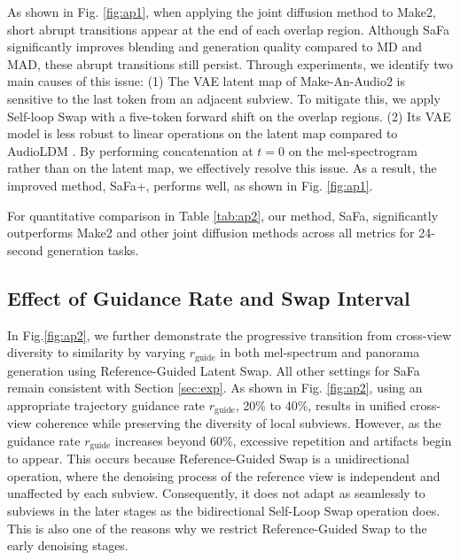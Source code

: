 As shown in Fig. \ref{fig:ap1}, when applying the joint diffusion method to Make2, short abrupt transitions appear at the end of each overlap region. Although SaFa significantly improves blending and generation quality compared to MD and MAD, these abrupt transitions still persist. Through experiments, we identify two main causes of this issue:
(1) The VAE latent map of Make-An-Audio2 is sensitive to the last token from an adjacent subview. To mitigate this, we apply Self-loop Swap with a five-token forward shift on the overlap regions. (2) Its VAE model is less robust to linear operations on the latent map compared to AudioLDM \cite{liu2023audioldm}. By performing concatenation at $t=0$ on the mel-spectrogram rather than on the latent map, we effectively resolve this issue. As a result, the improved method, SaFa+, performs well, as shown in Fig. \ref{fig:ap1}.

For quantitative comparison in Table \ref{tab:ap2}, our method, SaFa, significantly outperforms Make2 and other joint diffusion methods across all metrics for 24-second generation tasks.


\subsection{Effect of Guidance Rate and Swap Interval}
In Fig.\ref{fig:ap2}, we further demonstrate the progressive transition from cross-view diversity to similarity by varying $r_\text{guide}$ in both mel-spectrum and panorama generation using Reference-Guided Latent Swap. All other settings for SaFa remain consistent with Section \ref{sec:exp}. As shown in Fig. \ref{fig:ap2}, using an appropriate trajectory guidance rate $r_\text{guide}$, 20\% to 40\%, results in unified cross-view coherence while preserving the diversity of local subviews. However, as the guidance rate $r_\text{guide}$ increases beyond 60\%, excessive repetition and artifacts begin to appear. This occurs because Reference-Guided Swap is a unidirectional operation, where the denoising process of the reference view is independent and unaffected by each subview. Consequently, it does not adapt as seamlessly to subviews in the later stages as the bidirectional Self-Loop Swap operation does. This is also one of the reasons why we restrict Reference-Guided Swap to the early denoising stages.


